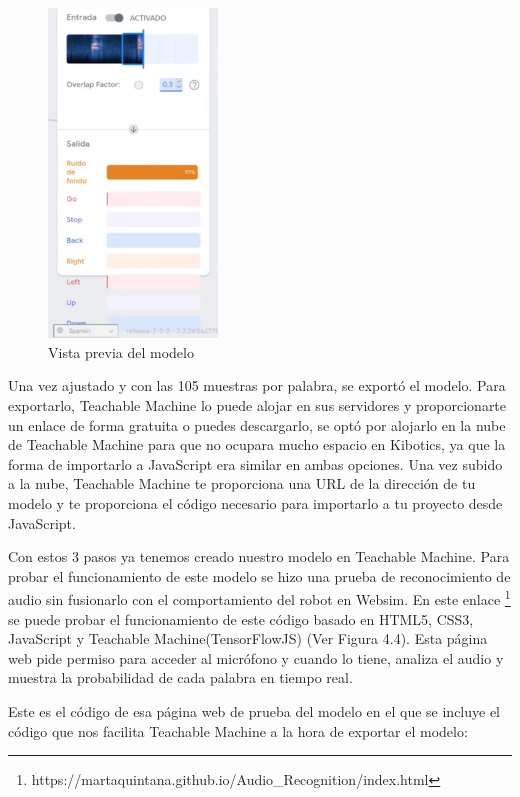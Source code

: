 \begin{itemize}
\begin{figure}[H]
 \centering
    \includegraphics[width=0.4\textwidth, height=0.6\textwidth]{chapters/images/teachablemachine2.png}
    \caption{Vista previa del modelo}
\end{figure}
 

Una vez ajustado y con las 105 muestras por palabra, se exportó el modelo. 
Para exportarlo, Teachable Machine lo puede alojar en sus servidores y proporcionarte  un enlace de forma gratuita o puedes descargarlo, se optó por alojarlo en la nube de Teachable Machine para que no ocupara mucho espacio en Kibotics, ya que la forma de importarlo  a JavaScript era similar en ambas opciones.
Una vez subido a la nube, Teachable Machine te proporciona una URL de la dirección de tu modelo y  te proporciona el código necesario para importarlo a tu proyecto desde JavaScript.
\end{itemize}

Con estos 3 pasos ya tenemos creado nuestro modelo en Teachable Machine. Para probar el funcionamiento de este modelo se hizo una prueba de reconocimiento de audio sin fusionarlo con el comportamiento del robot en Websim. En este enlace \footnote{https://martaquintana.github.io/Audio\_Recognition/index.html} se puede probar el funcionamiento de este código basado en HTML5, CSS3, JavaScript y Teachable Machine(TensorFlowJS) (Ver Figura 4.4). Esta página web pide permiso para acceder al micrófono y cuando lo tiene, analiza el audio  y muestra la probabilidad de cada palabra en tiempo real.  

Este es el código de esa página web de prueba del modelo en el que se incluye el código que nos facilita Teachable Machine a la hora de exportar el modelo:

